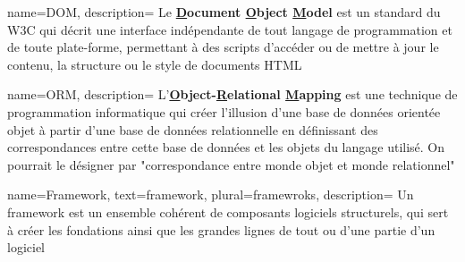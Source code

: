 {
    name=DOM,
    description=
    {
        Le \textbf{\underline{D}ocument \underline{O}bject \underline{M}odel} est un standard du W3C qui décrit une interface indépendante de tout langage de programmation et de toute plate-forme, permettant à des scripts d'accéder ou de mettre à jour le contenu, la structure ou le style de documents HTML
    }
}

{
    name=ORM,
    description=
    {
        L'\textbf{\underline{O}bject-\underline{R}elational \underline{M}apping} est une technique de programmation informatique qui créer l'illusion d'une base de données orientée objet à partir d'une base de données relationnelle en définissant des correspondances entre cette base de données et les objets du langage utilisé. On pourrait le désigner par "correspondance entre monde objet et monde relationnel"
    }
}

{
    name=Framework,
    text=framework,
    plural=framewroks,
    description=
    {
        Un framework est un ensemble cohérent de composants logiciels structurels, qui sert à créer les fondations ainsi que les grandes lignes de tout ou d’une partie d'un logiciel
    }
}